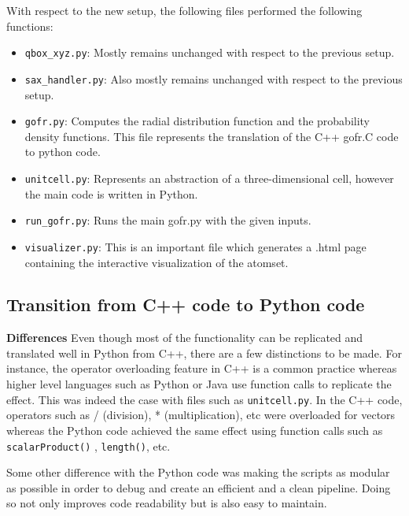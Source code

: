 With respect to the new setup, the following files performed the following functions: 

\begin{itemize}
        
    \item \verb|qbox_xyz.py|: Mostly remains unchanged with respect to the previous setup.
    
    \item \verb|sax_handler.py|: Also mostly remains unchanged with respect to the previous setup.

    \item \verb|gofr.py|: Computes the radial distribution function and the probability density functions. This file represents the translation of the C++ gofr.C code to python code. 
    
    \item \verb|unitcell.py|: Represents an abstraction of a three-dimensional cell, however the main code is written in Python.
    
    \item \verb|run_gofr.py|: Runs the main gofr.py with the given inputs.

    \item \verb|visualizer.py|: This is an important file which generates a .html page containing the interactive visualization of the atomset.
    
\end{itemize}



\subsection*{Transition from C++ code to Python code}


\textbf{Differences}
Even though most of the functionality can be replicated and translated well in Python from C++, there are a few distinctions to be made. For instance, the operator overloading feature in C++ is a common practice whereas higher level languages such as Python or Java use function calls to replicate the effect. This was indeed the case with files such as \verb|unitcell.py|. In the C++ code, operators such as / (division), * (multiplication), etc were overloaded for vectors whereas the Python code achieved the same effect using function calls such as \verb|scalarProduct()| , \verb|length()|, etc.

Some other difference with the Python code was making the scripts as modular as possible in order to debug and create an efficient and a clean pipeline. Doing so not only improves code readability but is also easy to maintain. 

